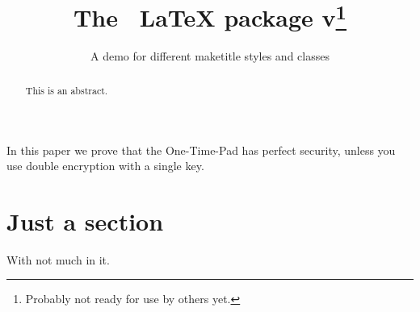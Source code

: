 \documentclass[journal=tches]{iacrtrans}
\title[plaintext={The metacapture LaTeX package},
       running={The \pkgname\ \LaTeX\ package v\pkgversion},
      ]{The \pkgname\ \textrm{\LaTeX} package v\pkgversion\footnote{Probably not ready for use by others yet.}}
\subtitle{A demo for different maketitle styles and classes}
\begin{document}
\maketitle

\begin{abstract}
  This is an abstract.
\end{abstract}
\begin{textabstract}
In this paper we prove that the One-Time-Pad has perfect security, unless you use
double encryption with a single key.
\end{textabstract}
\section{Just a section}
With not much in it.
\end{document}
